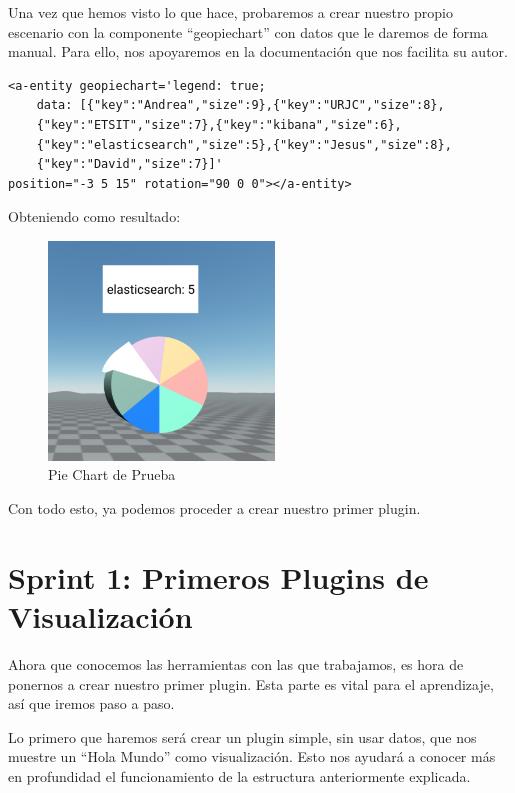 \documentclass[a4paper, 12pt]{book}
\begin{document}
Una vez que hemos visto lo que hace, probaremos a crear nuestro propio escenario con la componente “geopiechart” con datos que le daremos de forma manual. Para ello, nos apoyaremos en la documentación que nos facilita su autor.

\begin{lstlisting}[frame=single]
<a-entity geopiechart='legend: true;
    data: [{"key":"Andrea","size":9},{"key":"URJC","size":8},
    {"key":"ETSIT","size":7},{"key":"kibana","size":6},
    {"key":"elasticsearch","size":5},{"key":"Jesus","size":8},
    {"key":"David","size":7}]'
position="-3 5 15" rotation="90 0 0"></a-entity>

\end{lstlisting}

Obteniendo como resultado:

\begin{figure}[H]
  \centering
  \includegraphics[width=6cm, keepaspectratio]{img/development/prueba-babiaxr.png}
  \caption{Pie Chart de Prueba}
  \label{fig:pruebababiaxr}
\end{figure}

Con todo esto, ya podemos proceder a crear nuestro primer plugin.



\section{Sprint 1: Primeros Plugins de Visualización }
\label{sec:sprint1}

Ahora que conocemos las herramientas con las que trabajamos, es hora de ponernos a crear nuestro primer plugin. Esta parte es vital para el aprendizaje, así que iremos paso a paso.

Lo primero que haremos será crear un plugin simple, sin usar datos, que nos muestre un “Hola Mundo” como visualización. Esto nos ayudará a conocer más en profundidad el funcionamiento  de la estructura anteriormente explicada.
\end{document}
